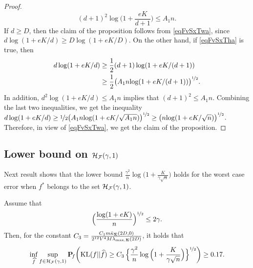 \begin{proof}
	\begin{equation}\label{eqFvSxTha}
	(d+1)^2\log\Big(1+\frac{e  K}{d+1}\Big)\le A_1 n.
	\end{equation}
	If $d\ge D$, then the claim of the proposition follows from \eqref{eqFvSxTwa}, since
	$d\log(1+eK/d)\ge D\log(1+eK/D)$. On the other hand, if \eqref{eqFvSxTha} is true, then
	\begin{align}
	d\log(1+eK/d) 
	&\ge \frac12 (d+1)\log(1+eK/(d+1))\nonumber \\
	&\ge \frac12 \big({A_1 n}{\log(1+eK/(d+1))}\big)^{\nicefrac12}.
	\end{align}
	In addition, $d^2\log(1+eK/d)\le A_1 n$ implies that $(d+1)^2 \le A_1 n$. Combining the last
	two inequalities, we get the inequality $d\log(1+eK/d)  \ge \nicefrac12 \big({A_1 n}{\log(1+eK/\sqrt{A_1n})}\big)^{\nicefrac12}\ge  \big({n}{\log(1+eK/\sqrt{n})}\big)^{\nicefrac12}$. 
	Therefore, in view of \eqref{eqFvSxTwa}, we get the claim of the proposition.
\end{proof}


\subsection{Lower bound on $\mathcal H_\mathcal F(\gamma,1)$} %

Next result shows that the lower bound ${\frac{\gamma^2}n\log\big(1+\frac{K}{\gamma\sqrt{n}}\big)}$ 
holds for the worst case error when $f^*$ belongs to the set $\mathcal H_\mathcal F(\gamma,1)$. 
\begin{proposition}\label{prop:lower:2}
	Assume that
	\begin{equation}
	\Big(\frac{\log(1+eK)}{n}\Big)^{\nicefrac12}\le 2\gamma.
	\end{equation}
	Then, for the constant $C_3 =
	\frac{C_1 m \bar\kappa_{\boldsymbol\Sigma}(2D,0) }{2^{12}V^4 M\lambda_{\max,\boldsymbol\Sigma}(2D)}$,
	it holds that
	\begin{equation}
	\inf_{\widehat f}\sup_{f \in \mathcal H_\mathcal F(\gamma,1)}\mathbf P\!_{f}\bigg({\rm KL}(f||\widehat f)\geq
	C_3\,\Big\{{\frac{\gamma^2}n\log\Big(1+\frac{K}{\gamma\sqrt{n}}\Big)}\Big\}^{\nicefrac12}\bigg)\geq 0.17.
	\end{equation}
\end{proposition}



